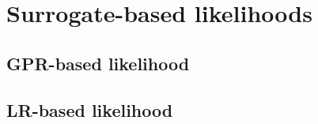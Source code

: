 \section{Surrogate-based likelihoods}\label{sec:likelihoods}
\subsection{GPR-based likelihood}\label{sec:GPlike}
\subsection{LR-based likelihood}\label{sec:LRlike}
